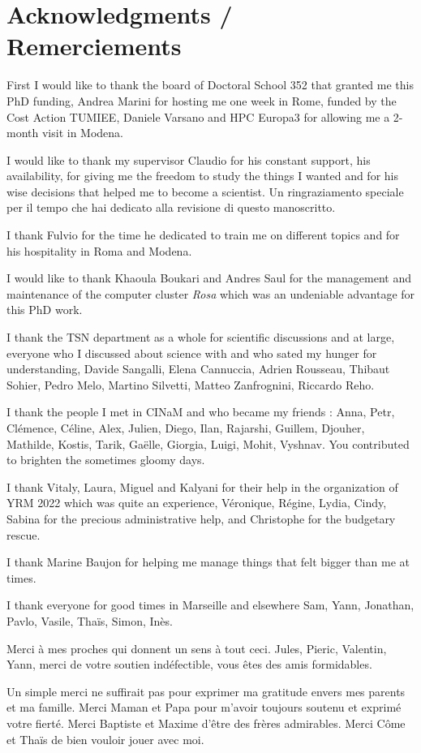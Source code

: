 \chapter*{Acknowledgments / Remerciements}

First I would like to thank the board of Doctoral School 352 that granted me this PhD funding, Andrea Marini for hosting me one week in Rome, funded by the Cost Action TUMIEE, Daniele Varsano and HPC Europa3 for allowing me a 2-month visit in Modena.

I would like to thank my supervisor Claudio for his constant support, his availability, for giving me the freedom to study the things I wanted and for his wise decisions that helped me to become a scientist. Un ringraziamento speciale per il tempo che hai dedicato alla revisione di questo manoscritto.

I thank Fulvio for the time he dedicated to train me on different topics and for his hospitality in Roma and Modena. 

I would like to thank Khaoula Boukari and Andres Saul for the management and maintenance of the computer cluster \textit{Rosa} which was an undeniable advantage for this PhD work.

I thank the TSN department as a whole for scientific discussions and at large, everyone who I discussed about science with and who sated my hunger for understanding, Davide Sangalli, Elena Cannuccia, Adrien Rousseau, Thibaut Sohier, Pedro Melo, Martino Silvetti, Matteo Zanfrognini, Riccardo Reho.

I thank the people I met in CINaM and who became my friends : Anna, Petr, Clémence, Céline, Alex, Julien, Diego, Ilan, Rajarshi, Guillem, Djouher, Mathilde, Kostis, Tarik, Gaëlle, Giorgia, Luigi,  Mohit, Vyshnav. You contributed to brighten the sometimes gloomy days. 

I thank Vitaly, Laura, Miguel and Kalyani for their help in the organization of YRM 2022 which was quite an experience, Véronique, Régine, Lydia, Cindy, Sabina for the precious administrative help, and Christophe for the budgetary rescue.

I thank Marine Baujon for helping me manage things that felt bigger than me at times.

I thank everyone for good times in Marseille and elsewhere Sam, Yann, Jonathan, Pavlo, Vasile, Thaïs, Simon, Inès.

Merci à mes proches qui donnent un sens à tout ceci. Jules, Pieric, Valentin, Yann, merci de votre soutien indéfectible, vous êtes des amis formidables.

Un simple merci ne suffirait pas pour exprimer ma gratitude envers mes parents et ma famille. Merci Maman et Papa pour m'avoir toujours soutenu et exprimé votre fierté. Merci Baptiste et Maxime d'être des frères admirables. Merci Côme et Thaïs de bien vouloir jouer avec moi.